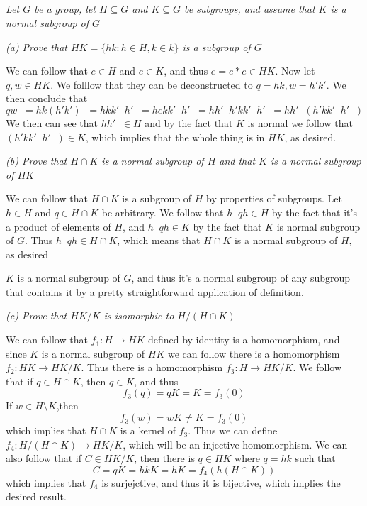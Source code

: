 \documentclass[11pt,oneside,titlepage]{book}
\DeclareMathOperator \inv {^{-1}}
\newcommand{\set}[1]{\{ #1 \}}
\begin{document}
\subsection{}

\textit{Let $G$ be a group, let $H \subseteq G$ and $K \subseteq G$
  be subgroups, and assume that $K$ is a normal subgroup of $G$}

\textit{(a) Prove that $HK = \set{hk: h \in H, k \in k}$ is a subgroup of $G$}

We can follow that $e \in H$ and $e \in K$, and thus $e = e * e \in HK$.
Now let $q, w \in HK$. We folllow that they can be deconstructed to
$q = hk, w = h' k'$. We then conclude that 
$$q w\inv  = hk (h' k')\inv = h k k' \inv h'\inv = h e k k'\inv h'\inv  =
h h'\inv h' k k'\inv h'\inv = h h'\inv (h' k k'\inv h'\inv)$$
We then can see that $h h'\inv \in H$ and by the fact that $K$ is normal
we follow that $(h' k k'\inv h'\inv) \in K$, which implies that the whole thing
is in $HK$, as desired.

\textit{(b) Prove that $H \cap K$ is a normal subgroup of $H$ and that $K$
  is a normal subgroup of $HK$}

We can follow that $H \cap K$ is a subgroup of $H$ by properties
of subgroups.
Let $h \in H$ and $q \in H \cap K$ be arbitrary. We follow that
$h\inv q h \in H$ by the fact that it's a product of elements of $H$,
and $h\inv q h \in K$ by the fact that $K$ is normal subgroup of $G$.
Thus $h\inv q h \in H \cap K$, which means that $H \cap K$ is a
normal subgroup of $H$, as desired

$K$ is a normal subgroup of $G$, and thus it's a normal subgroup of any
subgroup that contains it by a pretty straightforward application
of definition.

\textit{(c) Prove that $HK/K$ is isomorphic to $H/(H \cap K)$}

We can follow that $f_1: H \to HK$ defined by identity is a homomorphism,
and since $K$ is a normal subgroup of $HK$ we can follow there is
a homomorphism $f_2: HK \to HK/K$. Thus there is a homomorphism
$f_3: H \to HK/K$. We follow that if
$q \in H \cap K$, then $q \in K$, and thus
$$f_3(q) = qK = K = f_3(0)$$
If $w \in H \setminus K$,then
$$f_3(w) = wK \neq K = f_3(0)$$
which implies that $H \cap K$ is a kernel of $f_3$. Thus we can define
$f_4: H/(H \cap K) \to HK / K$, which will be an injective homomorphism.
We can also follow that if $C \in HK/K$, then there is $q \in HK$
where $q = hk$ such that
$$C = qK = hkK = hK = f_4(h(H \cap K))$$
which implies that $f_4$ is surjejctive, and thus it is bijective,
which implies the desired result.
\end{document}
